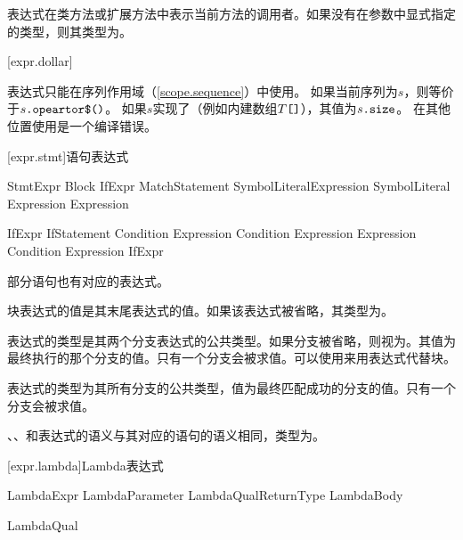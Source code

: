\pnum
表达式在类方法或扩展方法中表示当前方法的调用者。如果没有在参数中显式指定的类型，则其类型为。

[expr.dollar]{\tcode{\$}}

\pnum
表达式\tcode{\$}只能在序列作用域（\ref{scope.sequence}）中使用。
如果当前序列为$s$，则\tcode{\$}等价于$s\texttt{.opeartor\$()}$。
如果$s$实现了（例如内建数组$T\texttt{[]}$），其值为$s\texttt{.size}$。
在其他位置使用\tcode{\$}是一个编译错误。

[expr.stmt]{语句表达式}

\begin{bnf}{StmtExpr}
    Block \br
    IfExpr \br
    MatchStatement \br
     SymbolLiteral\bnfq Expression\bnfq \br
     SymbolLiteral\bnfq \br
     Expression\bnfq \br
     Expression\bnfq
\end{bnf}

\begin{bnf}{IfExpr}
    IfStatement \br
     Condition  Expression \br
     Condition  Expression  Expression \br
     Condition  Expression  IfExpr
\end{bnf}

\pnum
部分语句也有对应的表达式。

\pnum
块表达式的值是其末尾表达式的值。如果该表达式被省略，其类型为。

\pnum
{}表达式的类型是其两个分支表达式的公共类型。如果分支被省略，则视为。其值为最终执行的那个分支的值。只有一个分支会被求值。可以使用来用表达式代替块。

\pnum
{}表达式的类型为其所有分支的公共类型，值为最终匹配成功的分支的值。只有一个分支会被求值。

\pnum
{}、、和表达式的语义与其对应的语句的语义相同，类型为。

[expr.lambda]{Lambda表达式}

\begin{bnf}{LambdaExpr}
    LambdaParameter LambdaQual\bnfs ReturnType\bnfq \terminal{=>} LambdaBody
\end{bnf}

\begin{bnf}{LambdaQual}
\end{bnf}

